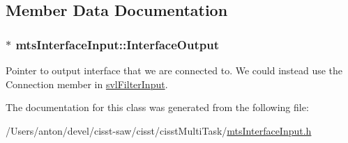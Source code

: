 \subsection{Member Data Documentation}
\hypertarget{classmts_interface_input_a22a07e3689380c0ae05f71814c22c591}{}
\subsubsection[{Interface\+Output}]{$\ast$ mts\+Interface\+Input\+::\+Interface\+Output\hspace{0.3cm}{\ttfamily [protected]}}\label{classmts_interface_input_a22a07e3689380c0ae05f71814c22c591}
Pointer to output interface that we are connected to. We could instead use the Connection member in \hyperlink{classsvl_filter_input}{svl\+Filter\+Input}. 

The documentation for this class was generated from the following file\+:\begin{DoxyCompactItemize}
\item 
/\+Users/anton/devel/cisst-\/saw/cisst/cisst\+Multi\+Task/\hyperlink{mts_interface_input_8h}{mts\+Interface\+Input.\+h}\end{DoxyCompactItemize}
